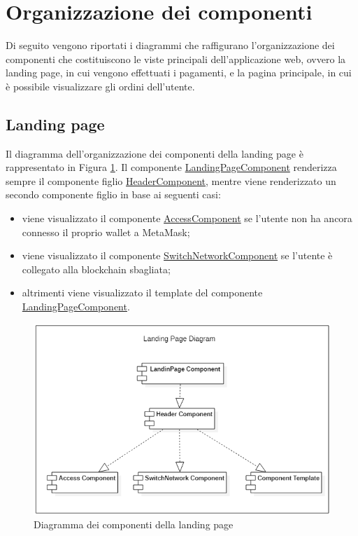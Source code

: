 
\section{Organizzazione dei componenti}
Di seguito vengono riportati i diagrammi che raffigurano l'organizzazione dei componenti che costituiscono le viste principali dell'applicazione web, ovvero la landing page, in cui vengono effettuati i pagamenti, e la pagina principale, in cui è possibile visualizzare gli ordini dell'utente.

\subsection*{Landing page}
Il diagramma dell'organizzazione dei componenti della landing page è rappresentato in Figura \ref{fig:components-landing-page}. Il componente \hyperref[sec:landing-component]{LandingPageComponent} renderizza sempre il componente figlio \hyperref[sec:header-component]{HeaderComponent}, mentre viene renderizzato un secondo componente figlio in base ai seguenti casi:
\begin{itemize}
    \item viene visualizzato il componente \hyperref[sec:access-component]{AccessComponent} se l'utente non ha ancora connesso il proprio wallet a MetaMask;
    \item viene visualizzato il componente \hyperref[sec:switch-component]{SwitchNetworkComponent} se l'utente è collegato alla blockchain sbagliata;
    \item altrimenti viene visualizzato il template del componente \hyperref[sec:landing-component]{LandingPageComponent}.
\end{itemize}

\begin{figure}[!h] 
    \centering 
    \includegraphics[width=0.8\columnwidth]{immagini/LandingPageComponentsDiagram.png}
    \caption{Diagramma dei componenti della landing page}
    \label{fig:components-landing-page}
\end{figure}

